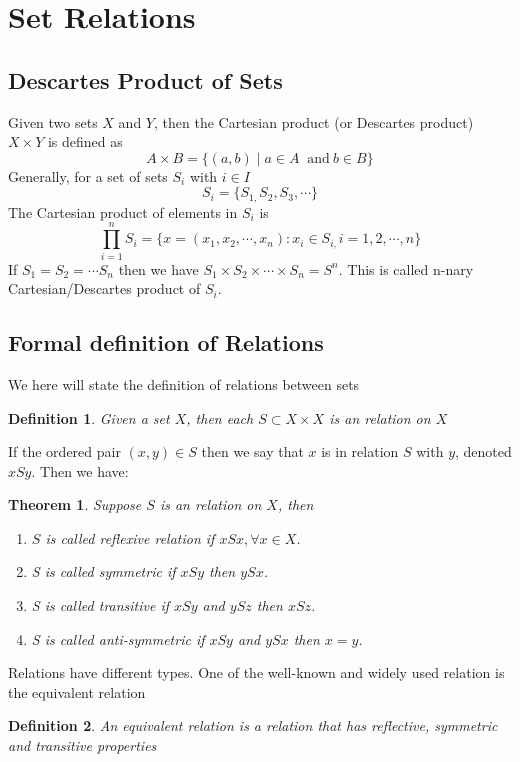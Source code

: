 \documentclass{book}
\newtheorem{Definition}{Definition}[section]
\newtheorem{Theorem}{Theorem}[section]
\numberwithin{identity}{subsection}
\numberwithin{Rule}{subsection}
\numberwithin{Theorem}{subsection}
\numberwithin{Definition}{subsection}
\begin{document}
\section{Set Relations}
\subsection{Descartes Product of Sets}
Given two sets $X$ and $Y$, then the Cartesian product (or Descartes product) $X \times Y$ is defined as $$\displaystyle A\times B=\{(a,b)\mid a\in A\ {\mbox{ and}}\ b\in B\}$$
Generally, for a set of sets $S_{i}$ with $i \in I$ $$S_{i}=\{S_{1,}S_{2}, S_{3},\cdots\}$$
The Cartesian product of elements in $S_{i}$ is $$\prod_{i=1}^{n} S_{i} = \{x = (x_{1}, x_{2}, \cdots , x_{n}): x_{i} \in S_{i,}i = 1,2,\cdots,n\}$$
If $S_{1}=S_{2}=\cdots S_{n}$ then we have $S_{1}\times S_{2} \times \cdots \times S_{n}= S^{n}$. This is called n-nary Cartesian/Descartes product of $S_i$. 

\subsection{Formal definition of Relations}

We here will state the definition of relations between sets
\begin{Definition}
    Given a set $X$, then each $S \subset X \times X$ is an relation on $X$
\end{Definition}

If the ordered pair $(x,y)\in S$ then we say that $x$ is in relation $S$ with $y$, denoted $xSy$. Then we have: 
\begin{Theorem}
    Suppose $S$ is an relation on $X$, then 
    \begin{enumerate}
        \item $S$ is called reflexive relation if $x S x, \forall x \in X$. 
        \item S is called symmetric if $xSy$ then $ySx$. 
        \item S is called transitive if $xSy$ and $ySz$ then $xSz$. 
        \item S is called anti-symmetric if $xSy$ and $ySx$ then $x=y$.
    \end{enumerate}
\end{Theorem}

Relations have different types. One of the well-known and widely used relation is the equivalent relation

\begin{Definition}
    An equivalent relation is a relation that has reflective, symmetric and transitive properties
\end{Definition}
\end{document}
